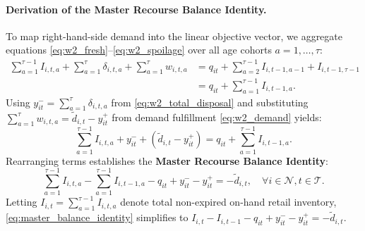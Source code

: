 \documentclass[11pt,a4paper]{article}
\theoremstyle{definition}
\theoremstyle{remark}
\begin{document}
\paragraph{Derivation of the Master Recourse Balance Identity.}
To map right-hand-side demand into the linear objective vector, we aggregate equations \eqref{eq:w2_fresh}--\eqref{eq:w2_spoilage} over all age cohorts $a = 1, \dots, \tau$:
\begin{align*}
    \sum_{a=1}^{\tau-1} I_{i,t,a} + \sum_{a=1}^\tau \delta_{i,t,a} + \sum_{a=1}^\tau w_{i,t,a} &= q_{it} + \sum_{a=2}^{\tau-1} I_{i,t-1,a-1} + I_{i,t-1,\tau-1} \\
    &= q_{it} + \sum_{a=1}^{\tau-1} I_{i,t-1,a}.
\end{align*}
Using $y_{it}^- = \sum_{a=1}^\tau \delta_{i,t,a}$ from \eqref{eq:w2_total_disposal} and substituting $\sum_{a=1}^\tau w_{i,t,a} = \tilde{d}_{i,t} - y_{it}^+$ from demand fulfillment \eqref{eq:w2_demand} yields:
\begin{equation*}
    \sum_{a=1}^{\tau-1} I_{i,t,a} + y_{it}^- + \left( \tilde{d}_{i,t} - y_{it}^+ \right) = q_{it} + \sum_{a=1}^{\tau-1} I_{i,t-1,a}.
\end{equation*}
Rearranging terms establishes the \textbf{Master Recourse Balance Identity}:
\begin{equation}
    \sum_{a=1}^{\tau-1} I_{i,t,a} - \sum_{a=1}^{\tau-1} I_{i,t-1,a} - q_{it} + y_{it}^- - y_{it}^+ = -\tilde{d}_{i,t}, \quad \forall i \in \mathcal{N}, t \in \mathcal{T}. \label{eq:master_balance_identity}
\end{equation}
Letting $I_{i,t} = \sum_{a=1}^{\tau-1} I_{i,t,a}$ denote total non-expired on-hand retail inventory, \eqref{eq:master_balance_identity} simplifies to $I_{i,t} - I_{i,t-1} - q_{it} + y_{it}^- - y_{it}^+ = -\tilde{d}_{i,t}$.
\end{document}

